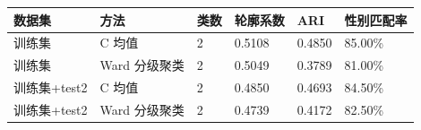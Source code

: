 \begin{tabular}{p{2.4cm}p{3.0cm}p{1.4cm}p{1.8cm}p{1.8cm}p{2.0cm}}
\toprule
数据集 & 方法 & 类数 & 轮廓系数 & ARI & 性别匹配率 \\
\midrule
训练集 & C 均值 & 2 & 0.5108 & 0.4850 & 85.00\% \\
训练集 & Ward 分级聚类 & 2 & 0.5049 & 0.3789 & 81.00\% \\
训练集+test2 & C 均值 & 2 & 0.4850 & 0.4693 & 84.50\% \\
训练集+test2 & Ward 分级聚类 & 2 & 0.4739 & 0.4172 & 82.50\% \\
\bottomrule
\end{tabular}
